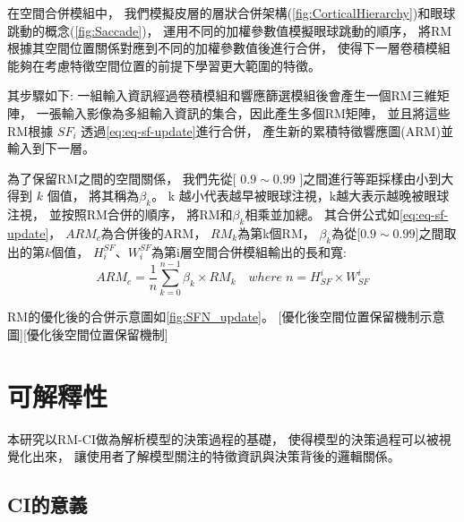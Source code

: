 \documentclass[class=NCU_thesis, crop=false]{standalone}
\begin{document}
	在空間合併模組中，
	我們模擬皮層的層狀合併架構(\cref{fig:CorticalHierarchy})和眼球跳動的概念(\cref{fig:Saccade})，
	運用不同的加權參數值模擬眼球跳動的順序，
	將RM根據其空間位置關係對應到不同的加權參數值後進行合併，
	使得下一層卷積模組能夠在考慮特徵空間位置的前提下學習更大範圍的特徵。

	其步驟如下:
	一組輸入資訊經過卷積模組和響應篩選模組後會產生一個RM三維矩陣，
	一張輸入影像為多組輸入資訊的集合，因此產生多個RM矩陣，
	並且將這些RM根據 $SF_{i}$ 透過\cref{eq:eq-sf-update}進行合併，
	產生新的累積特徵響應圖(ARM)並輸入到下一層。

	為了保留RM之間的空間關係，
	我們先從[ $0.9 \sim 0.99$ ]之間進行等距採樣由小到大得到 $k$ 個值，
	將其稱為$\beta_{k}$。
	k 越小代表越早被眼球注視，k越大表示越晚被眼球注視，
	並按照RM合併的順序，
	將RM和$\beta_{k}$相乘並加總。
	其合併公式如\cref{eq:eq-sf-update}，
	$ARM_{c}$為合併後的ARM，
	$RM_{k}$為第k個RM，
	$\beta_{k}$為從[$0.9 \sim 0.99$]之間取出的第$k$個值，
	${H}_{i}^{SF}$、${W}_{i}^{SF}$為第i層空間合併模組輸出的長和寬:\\
		\begin{equation}
		    \label{eq:eq-sf-update}
		    ARM_{c}=\frac{1}{n} \sum_{k = 0}^{n-1} \beta_{k} \times RM_{k}  \quad where \; n = \textit{H}^{i}_{SF} \times \textit{W}^{i}_{SF}
		\end{equation}

	
	
	RM的優化後的合併示意圖如\cref{fig:SFN_update}。
	[優化後空間位置保留機制示意圖][優化後空間位置保留機制]


\pagebreak
\section{可解釋性} 
本研究以RM-CI做為解析模型的決策過程的基礎，
使得模型的決策過程可以被視覺化出來，
讓使用者了解模型關注的特徵資訊與決策背後的邏輯關係。

	\subsection{CI的意義}
	\label{section:InterablePicture}
\end{document}

